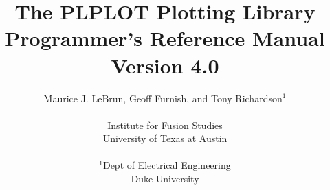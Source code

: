 \newenvironment{ename}{\list{}{\setlength{\leftmargin}{0pc}}\item[]}{\endlist}
\newenvironment{edescr}{\list{}{\setlength{\leftmargin}{4pc}
\setlength{\topsep}{0pc}}\item[]}{\endlist}
\newenvironment{eargn}{\list{}{\setlength{\leftmargin}{2pc}}\item[]}{\endlist}
\newenvironment{eargd}{\list{}{\setlength{\leftmargin}{2pc}
\setlength{\topsep}{0pc}\setlength{\parskip}{0pc}}\item[]}{\endlist}
\newcommand{\name}[1]{\begin{ename}{\tt #1}\end{ename}}
\newcommand{\bname}[1]{\pagebreak[2]\begin{ename}{\fbox{\tt #1}}\end{ename}\nopagebreak}
\newcommand{\bnameC}[1]{\pagebreak[2]\begin{ename}{\fbox{\tt #1}\qquad(C)}\end{ename}\nopagebreak}
\newcommand{\bnameF}[1]{\pagebreak[2]\begin{ename}{\fbox{\tt #1}\qquad(Fortran)}\end{ename}\nopagebreak}
\newcommand{\bnameCF}[4]{\pagebreak[2]\begin{ename}
	{\fbox{\tt#1}{\qquad#2}}\\{\fbox{\tt#3}{\qquad#4}}\end{ename}\nopagebreak}
\newcommand{\descr}[1]{\begin{edescr}#1\end{edescr}}
\newcommand{\argu}[2]{\pagebreak[2]\begin{eargn}#1:\nopagebreak\begin{eargd}#2\end{eargd}\end{eargn}}
\newcommand{\rou}[1]{{\tt #1} (page~\pageref{#1})}
\setlength{\textheight}{23 cm}
\setlength{\textwidth}{16 cm}
\setlength{\oddsidemargin}{0 cm}
\setlength{\evensidemargin}{\oddsidemargin}
\setlength{\topmargin}{-1.5 cm}



\title{ The PLPLOT Plotting Library \\ 
	Programmer's Reference Manual \\
	Version 4.0}
\author{
	Maurice J. LeBrun, 
	Geoff Furnish, and
	Tony Richardson$^1$\\
\\
	Institute for Fusion Studies\\
	University of Texas at Austin\\
	\\
	$^1$Dept of Electrical Engineering\\
	Duke University\\
	}

